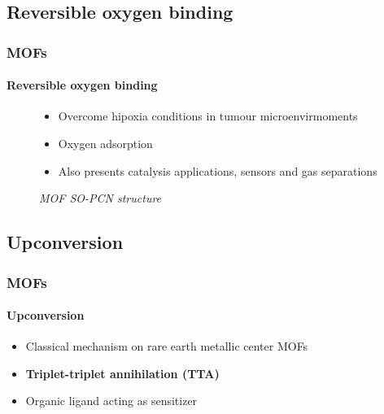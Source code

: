 \documentclass[aspectratio=169,fleqn,table]{beamer}
\begin{document}
\subsection{Reversible oxygen binding}
\begingroup
{}
\begin{frame}

\frametitle{MOFs}
\framesubtitle{Reversible oxygen binding}
\begin{figure}
\centering
\begin{minipage}[border=15pt]{0.45\textwidth}
    \vspace{-160pt}
    \begin{itemize}
        \item
        Overcome hipoxia conditions in tumour microenvirmoments
        \item
        Oxygen adsorption
        \item
        Also presents catalysis applications, sensors and gas separations
    \end{itemize}
\end{minipage}
\hfill
\begin{minipage}[b]{0.4\textwidth}
	\centering
	\vspace{-35pt}
    \vspace{-6pt}
    \caption{%
    \textit{MOF SO-PCN structure}}
\end{minipage}
\end{figure}

\end{frame}
\endgroup


\subsection{Upconversion}
\begin{frame}
\frametitle{MOFs}
\framesubtitle{Upconversion}

\begin{itemize}
    \item
    Classical mechanism on rare earth metallic center MOFs
    \item
    \textbf{Triplet-triplet annihilation (TTA)}
    \item
    Organic ligand acting as sensitizer
\end{itemize}

\end{frame}
\end{document}
